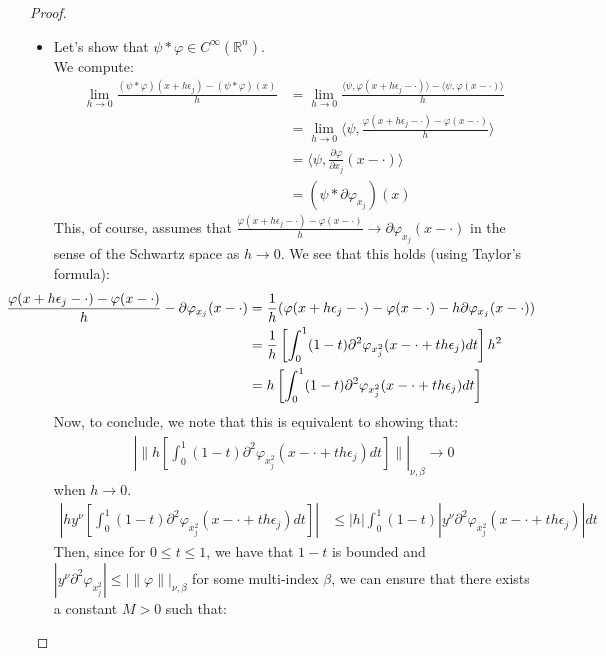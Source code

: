 \begin{proof}{}
  \begin{itemize}
    \item Let’s show that $\psi*\varphi\in C^{\infty}(\mathbb{R}^n)$.\\
      We compute:
      \begin{align*}
        \lim_{h\rightarrow 0}\frac{(\psi*\varphi)(x+h\epsilon_j)-(\psi*\varphi)(x)}{h}&=\lim_{h\rightarrow 0}\frac{\langle \psi, \varphi(x+h\epsilon_j-\cdot) \rangle-\langle \psi, \varphi(x-\cdot) \rangle}{h}\\
        &=\lim_{h\rightarrow 0}\langle \psi, \frac{\varphi(x+h\epsilon_j-\cdot)-\varphi(x-\cdot)}{h} \rangle\\
        &=\langle \psi, \frac{\partial \varphi}{\partial x_j} (x-\cdot) \rangle\\
        &=(\psi * \partial \varphi_{x_j})(x)
      \end{align*}
      This, of course, assumes that $\frac{\varphi(x+h\epsilon_j-\cdot)-\varphi(x-\cdot)}{h} \rightarrow \partial\varphi_{x_j}(x-\cdot)$ in the sense of the Schwartz space as $h\rightarrow 0$. We see that this holds (using Taylor's formula):
      \begin{align*}
        \hspace{-1.2cm}\frac{\varphi(x+h\epsilon_j-\cdot)-\varphi(x-\cdot)}{h} - \partial\varphi_{x_j}(x-\cdot)&=\frac{1}{h}(\varphi(x+h\epsilon_j-\cdot)-\varphi(x-\cdot)-h\partial\varphi_{x_j}(x-\cdot))\\
        &=\frac{1}{h}\left[\int_{0}^{1}(1-t)\partial^{2}\varphi_{x^2_{j}}(x-\cdot+th\epsilon_j)dt\right]h^2\\
        &=h\left[\int_{0}^{1}(1-t)\partial^{2}\varphi_{x^2_{j}}(x-\cdot+th\epsilon_j)dt\right]\\
      \end{align*}
      Now, to conclude, we note that this is equivalent to showing that:
      \begin{align*}
        |\|h\left[\int_{0}^{1}(1-t)\partial^{2}\varphi_{x^2_{j}}(x-\cdot+th\epsilon_j)dt\right]\||_{\nu,\beta}\rightarrow 0
      \end{align*}
      when $h\rightarrow 0$.
      \begin{align*}
        \left|hy^{\nu}\left[\int_{0}^{1}(1-t)\partial^{2}\varphi_{x^2_{j}}(x-\cdot+th\epsilon_j)dt\right]\right|&\leq |h|\int_{0}^{1}(1-t)|y^{\nu}\partial^{2}\varphi_{x^2_{j}}(x-\cdot+th\epsilon_j)|dt
      \end{align*}
      Then, since for $0\leq t \leq 1$, we have that $1-t$ is bounded and $|y^{\nu}\partial^2\varphi_{x^2_j}|\leq |\|\varphi\||_{\nu,\beta}$ for some multi-index $\beta$, we can ensure that there exists a constant $M>0$ such that:

\end{itemize}
\end{proof}
